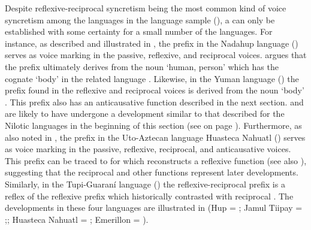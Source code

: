 Despite reflexive-reciprocal syncretism being the most common kind of voice syncretism among the languages in the language sample (), a  can only be established with some certainty for a small number of the languages. For instance, as described and illustrated in , the prefix  in the Nadahup language  () serves as voice marking in the passive, reflexive, and reciprocal voices. \cite[474, 486]{epps:2008} argues that the prefix ultimately derives from the noun  ‘human, person’ which has the cognate  ‘body’ in the related language . Likewise, in the Yuman language  () the prefix  found in the reflexive and reciprocal voices is derived from the noun  ‘body’ \citep[167]{miller:a:2001}. This prefix also has an anticausative function described in the next section.  and  are likely to have undergone a development similar to that described for the Nilotic languages in the beginning of this section (see  on page \pageref{tab:ch7:refl-recp-nilotic}). Furthermore, as also noted in , the prefix  in the Uto-Aztecan language Huasteca Nahuatl () serves as voice marking in the passive, reflexive, reciprocal, and anticausative voices. This prefix can be traced to   for which \cite{langacker:1976} reconstructs a reflexive function (see also \citealt[16]{anderson:al:1976}), suggesting that the reciprocal and other functions represent later developments. Similarly, in the Tupi-Guaraní language  () the reflexive-reciprocal prefix  \citep[348ff.]{rose:2003} is a reflex of the  reflexive prefix  which historically contrasted with reciprocal  \citep[534f.]{jensen:1998}. The developments in these four languages are illustrated in  (Hup = \citealt[479, 486]{epps:2008}; Jamul Tiipay = \citealt[166f.]{miller:a:2001};; Huasteca Nahuatl = \citealt[90]{llanes:al:2017}; Emerillon = \citealt[349f.]{rose:2003}).

